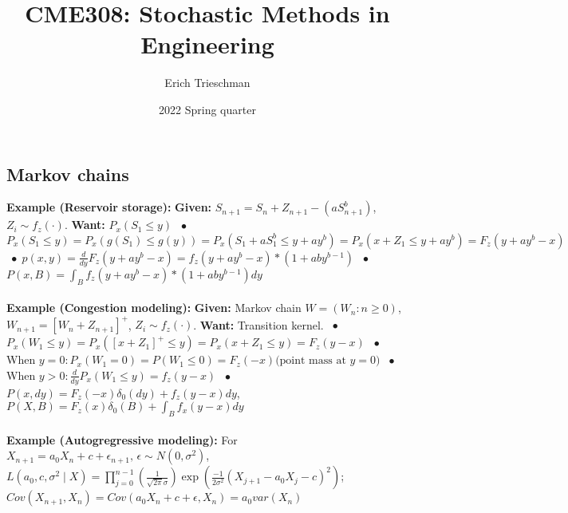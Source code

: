 \documentclass[9pt]{extarticle}
\title{CME308: Stochastic Methods in Engineering}
\author{Erich Trieschman}
\date{2022 Spring quarter}
\newcommand*\bspace{$\; \bullet \;$}
\begin{document}
\subsection{Markov chains}
\textbf{Example (Reservoir storage):} \textbf{Given:} $S_{n+1} = S_n +Z_{n+1} - (aS_{n+1}^b)$, $Z_i \sim f_z(\cdot)$. \textbf{Want:} $P_x(S_1 \leq y)$ \bspace $P_x(S_1 \leq y) = P_x(g(S_1) \leq g(y)) = P_x(S_1 + aS_1^b \leq y + ay^b) = P_x(x + Z_1 \leq y + ay^b) = F_z(y + ay^b - x)$ \bspace $p(x,y) = \frac{d}{dy}F_z(y + ay^b - x) = f_z(y + ay^b - x)*(1 + aby^{b-1})$ \bspace $P(x,B) = \int_Bf_z(y + ay^b - x)*(1 + aby^{b-1})dy$\\\\
\textbf{Example (Congestion modeling):} \textbf{Given:} Markov chain $W = (W_n:n\geq 0)$, $W_{n+1} = [W_n + Z_{n+1}]^+$, $Z_i \sim f_z(\cdot)$. \textbf{Want:} Transition kernel. \bspace $P_x(W_1 \leq y) = P_x([x + Z_1]^+ \leq y) = P_x(x + Z_1 \leq y) = F_z(y-x)$ \bspace When $y = 0: P_x(W_1 = 0) = P(W_1 \leq 0) = F_z(-x) \textrm{(point mass at $y=0$)}$ \bspace When $y > 0: \frac{d}{dy}P_x(W_1 \leq y) = f_z(y-x)$ \bspace $P(x,dy) = F_z(-x)\delta_0(dy) + f_z(y-x)dy$, $P(X, B) = F_z(x)\delta_0(B) + \int_Bf_x(y-x)dy$\\\\
\textbf{Example (Autogregressive modeling):} For $X_{n+1} = a_0X_n + c + \epsilon_{n+1}, \, \epsilon \sim N(0,\sigma^2)$, $L(a_0,c,\sigma^2 \mid X) = \prod_{j=0}^{n-1}(\frac{1}{\sqrt{2\pi}\sigma})\exp(\frac{-1}{2\sigma^2}(X_{j+1} - a_0X_j - c)^2)$; $Cov(X_{n+1}, X_n) = Cov(a_0X_n + c+ \epsilon, X_n) = a_0var(X_n)$


\end{document}
